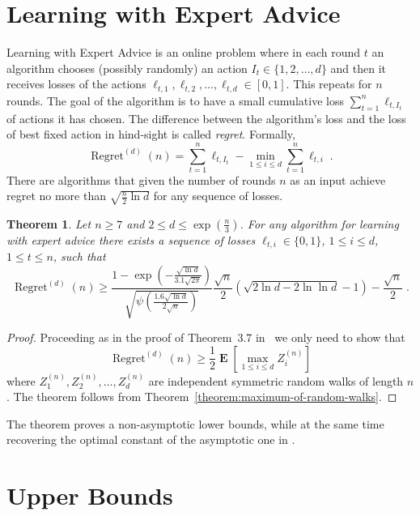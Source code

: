 \documentclass{article}
\DeclareMathOperator*{\Exp}{\mathbf{E}}
\DeclareMathOperator{\Regret}{Regret}
\newtheorem{theorem}{Theorem}
\begin{document}
\section{Learning with Expert Advice}
\label{section:experts}

Learning with Expert Advice is an online problem where in each round $t$ an
algorithm chooses (possibly randomly) an action $I_t \in \{1,2,\dots,d\}$ and
then it receives losses of the actions $\ell_{t,1}, \ell_{t,2}, \dots,
\ell_{t,d} \in [0,1]$. This repeats for $n$ rounds.  The goal of the algorithm
is to have a small cumulative loss $\sum_{t=1}^n \ell_{t,I_t}$ of
actions it has chosen. The difference between the algorithm's loss and the loss of best fixed
action in hind-sight is called \emph{regret}.  Formally,
$$
\Regret^{(d)}(n) = \sum_{t=1}^n \ell_{t,I_t} - \min_{1 \le i \le d} \sum_{t=1}^n \ell_{t,i} \; .
$$
There are algorithms that given the number of rounds $n$ as an input achieve regret no more than $\sqrt{\frac{n}{2} \ln d}$
for any sequence of losses.

\begin{theorem}
Let $n \ge 7$ and $2 \le d \le \exp(\frac{n}{3})$. For any algorithm for learning with expert advice there exists a sequence
of losses $\ell_{t,i} \in \{0,1\}$, $1 \le i \le d$, $1 \le t \le n$, such that
$$
\Regret^{(d)}(n) \ge \frac{1 - \exp\left(-\frac{\sqrt{\ln d}}{3.1 \sqrt{2\pi}}\right)}{\sqrt{\psi\left(\frac{1.6 \sqrt{\ln d}}{2 \sqrt{n}}\right)}} \frac{\sqrt{n}}{2} \left(\sqrt{2 \ln d - 2 \ln \ln d}-1\right) - \frac{\sqrt{n}}{2} \; .
$$
\end{theorem}

\begin{proof}
Proceeding as in the proof of Theorem~3.7 in~\citep{Cesa-BianchiL06} we only need to show that
$$
\Regret^{(d)}{(n)} \ge \frac{1}{2} \Exp \left[ \max_{1 \le i \le d} Z^{(n)}_i \right]
$$
where $Z^{(n)}_1, Z^{(n)}_2, \dots, Z^{(n)}_d$ are independent symmetric random walks of length $n$. The theorem follows from Theorem~\ref{theorem:maximum-of-random-walks}.
\end{proof}

The theorem proves a non-asymptotic lower bounds, while at the same time
recovering the optimal constant of the asymptotic one in
\citet{Cesa-BianchiL06}.




\appendix

\section{Upper Bounds}
\label{section:upper-bounds}
\end{document}

